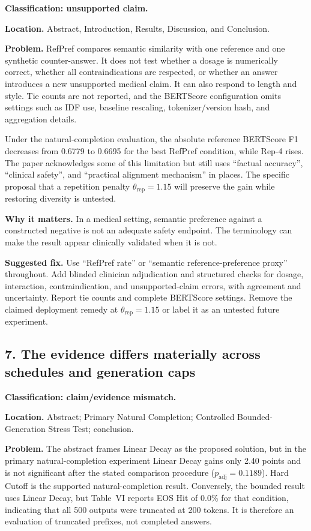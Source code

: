 \documentclass[11pt]{article}
\begin{document}
\textbf{Classification: unsupported claim.}

\textbf{Location.} Abstract, Introduction, Results, Discussion, and Conclusion.

\textbf{Problem.} RefPref compares semantic similarity with one reference and one synthetic counter-answer.  It does not test whether a dosage is numerically correct, whether all contraindications are respected, or whether an answer introduces a new unsupported medical claim.  It can also respond to length and style.  Tie counts are not reported, and the BERTScore configuration omits settings such as IDF use, baseline rescaling, tokenizer/version hash, and aggregation details.

Under the natural-completion evaluation, the absolute reference BERTScore F1 decreases from 0.6779 to 0.6695 for the best RefPref condition, while Rep-4 rises.  The paper acknowledges some of this limitation but still uses ``factual accuracy'', ``clinical safety'', and ``practical alignment mechanism'' in places.  The specific proposal that a repetition penalty $\theta_{\text{rep}}=1.15$ will preserve the gain while restoring diversity is untested.

\textbf{Why it matters.} In a medical setting, semantic preference against a constructed negative is not an adequate safety endpoint.  The terminology can make the result appear clinically validated when it is not.

\textbf{Suggested fix.} Use ``RefPref rate'' or ``semantic reference-preference proxy'' throughout.  Add blinded clinician adjudication and structured checks for dosage, interaction, contraindication, and unsupported-claim errors, with agreement and uncertainty.  Report tie counts and complete BERTScore settings.  Remove the claimed deployment remedy at $\theta_{\text{rep}}=1.15$ or label it as an untested future experiment.

\subsection*{7. The evidence differs materially across schedules and generation caps}

\textbf{Classification: claim/evidence mismatch.}

\textbf{Location.} Abstract; Primary Natural Completion; Controlled Bounded-Generation Stress Test; conclusion.

\textbf{Problem.} The abstract frames Linear Decay as the proposed solution, but in the primary natural-completion experiment Linear Decay gains only 2.40 points and is not significant after the stated comparison procedure ($p_{\text{adj}}=0.1189$).  Hard Cutoff is the supported natural-completion result.  Conversely, the bounded result uses Linear Decay, but Table~VI reports EOS Hit of 0.0\% for that condition, indicating that all 500 outputs were truncated at 200 tokens.  It is therefore an evaluation of truncated prefixes, not completed answers.
\end{document}
